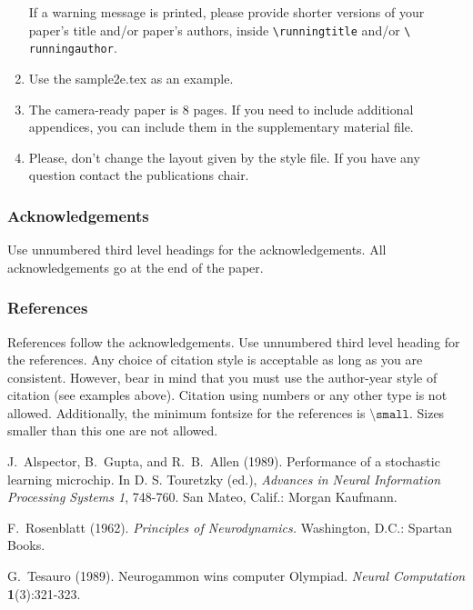 \documentclass[twoside]{article}
\begin{document}
\begin{enumerate}
    If a warning message is printed, please provide shorter versions
    of your paper's title and/or paper's authors, inside \texttt{\textbackslash runningtitle} and/or \texttt{\textbackslash
    runningauthor}.

    \item Use the sample2e.tex as an example.

    \item The camera-ready paper is 8 pages. If you need to include
      additional appendices, you can include them in the supplementary
      material file.  
   
    \item Please, don't change the layout given by the style file. If you have any
    question contact the publications chair.
      

\end{enumerate}

\subsubsection*{Acknowledgements}

Use unnumbered third level headings for the acknowledgements.  All acknowledgements go at the end of the paper.


\subsubsection*{References}

References follow the acknowledgements.  Use unnumbered third level heading for the references.  Any choice of citation style is acceptable
as long as you are consistent. However, bear in mind that you must use the author-year style of citation (see examples above). Citation
using numbers or any other type is not allowed. Additionally, the minimum fontsize for the references is $\texttt{\textbackslash small}$.
Sizes smaller than this one are not allowed.

J.~Alspector, B.~Gupta, and R.~B.~Allen  (1989). Performance of a stochastic learning microchip.  In D. S. Touretzky (ed.), {\it Advances
in Neural Information Processing Systems 1}, 748-760.  San Mateo, Calif.: Morgan Kaufmann.

F.~Rosenblatt (1962). {\it Principles of Neurodynamics.} Washington, D.C.: Spartan Books.

G.~Tesauro (1989). Neurogammon wins computer Olympiad.  {\it Neural Computation} {\bf 1}(3):321-323.
\end{document}
